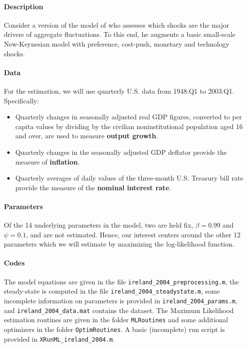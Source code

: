 \documentclass{article}
\begin{document}
\paragraph{Description}
Consider a version of the model of \textcite{Ireland_2004_TechnologyShocksNew} who assesses which shocks are the major drivers of aggregate fluctuations. To this end, he augments a basic small-scale New-Keynesian model with preference, cost-push, monetary and technology shocks.

\paragraph{Data}
For the estimation, we will use quarterly U.S. data from 1948:Q1 to 2003:Q1. Specifically:
\begin{itemize}
	\item Quarterly changes in seasonally adjusted real GDP figures, converted to per capita values by dividing by the civilian noninstitutional population aged 16 and over, are used to measure \textbf{output growth}.
	\item Quarterly changes in the seasonally adjusted GDP deflator provide the measure of \textbf{inflation}.
	\item Quarterly averages of daily values of the three-month U.S. Treasury bill rate provide the measure of the \textbf{nominal interest rate}.
\end{itemize}

\paragraph{Parameters}
Of the 14 underlying parameters in the model, two are held fix, $\beta=0.99$ and $\psi=0.1$, and are not estimated. Hence, our interest centers around the other 12 parameters which we will estimate by maximizing the log-likelihood function.

\paragraph{Codes}
The model equations are given in the file \texttt{ireland\_2004\_preprocessing.m}, the steady-state is computed in the file \texttt{ireland\_2004\_steadystate.m}, some incomplete information on parameters is provided in \texttt{ireland\_2004\_params.m}, and \texttt{ireland\_2004\_data.mat} contains the dataset. The Maximum Likelihood estimation routines are given in the folder \texttt{MLRoutines} and some additional optimizers in the folder \texttt{OptimRoutines}. A basic (incomplete) run script is provided in \texttt{XRunML\_ireland\_2004.m}.
\end{document}
